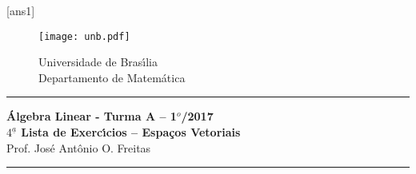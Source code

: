 \documentclass[12pt]{exam}
\newcommand{\vesp}[1]{\vspace{ #1  cm}}
\begin{document}
\pagestyle{empty}

[ans1]

\begin{figure}[h]
        \begin{minipage}[c]{1.7cm}
        \texttt{[image: unb.pdf]}
        \end{minipage}%
        \hspace{0pt}
        \begin{minipage}[c]{4in}
          {Universidade de Bras{\'\i}lia} \\
          {Departamento de Matem{\'a}tica}
\end{minipage}
\end{figure}

\vesp{-0.35} \hrule

\begin{center}
{\Large\bf \'Algebra Linear - Turma A -- 1$^{o}$/2017} \\ \vspace{9pt} {\large\bf
  $4^{\underline{a}}$ Lista de Exerc{\'\i}cios -- Espa\c{c}os Vetoriais}\\ \vspace{9pt} Prof. Jos{\'e} Ant{\^o}nio O. Freitas
\end{center}
\hrule

\vesp{.6}
\end{document}
